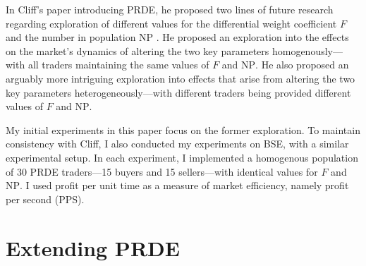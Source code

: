 \documentclass[conference]{IEEEtran}
\begin{document}
In Cliff's paper introducing PRDE, he proposed two lines of future research regarding exploration of different values for the differential weight coefficient $F$ and the number in population $\mathrm{NP}$ \cite{PRDE}.
He proposed an exploration into the effects on the market's dynamics of altering the two key parameters homogenously---with all traders maintaining the same values of $F$ and $\mathrm{NP}$.
He also proposed an arguably more intriguing exploration into effects that arise from altering the two key parameters heterogeneously---with different traders being provided different values of $F$ and $\mathrm{NP}$.

My initial experiments in this paper focus on the former exploration.
To maintain consistency with Cliff, I also conducted my experiments on BSE, with a similar experimental setup.
In each experiment, I implemented a homogenous population of 30 PRDE traders---15 buyers and 15 sellers---with identical values for $F$ and $\mathrm{NP}$.
I used profit per unit time as a measure of market efficiency, namely profit per second (PPS).

\section{Extending PRDE}



\end{document}
